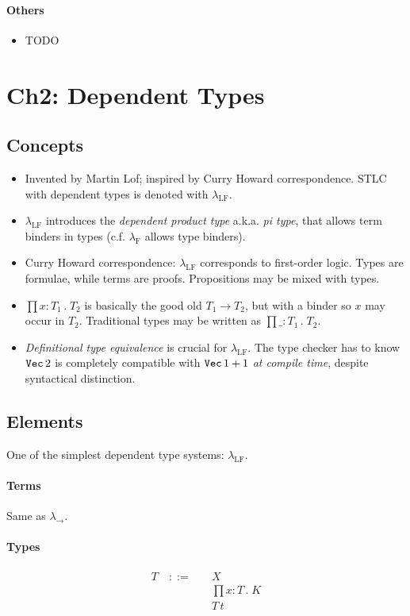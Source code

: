 \documentclass{article}
\newcommand{\TVec}{\text{\texttt{Vec}}}
\newcommand{\lambdaLF}{\lambda_{\text{LF}}}
\newcommand{\lambdaF}{\lambda_{\text{F}}}
\newcommand{\lambdato}{\lambda_{\to}}
\newcommand{\DT}{\, .\;}
\begin{document}
\paragraph{Others}
  \begin{itemize}
    \item TODO
  \end{itemize}

\section{Ch2: Dependent Types}
\subsection{Concepts}
  \begin{itemize}
    \item Invented by Martin Lof; inspired by Curry Howard correspondence. STLC with dependent types is denoted with $\lambdaLF$.
    \item $\lambdaLF$ introduces the \emph{dependent product type} a.k.a. \emph{pi type}, that allows term binders in types (c.f. $\lambdaF$ allows type binders).
    \item Curry Howard correspondence: $\lambdaLF$ corresponds to first-order logic.
        Types are formulae, while terms are proofs. Propositions may be mixed with types.
    \item $\prod x:T_1 \DT T_2$ is basically the good old $T_1 \to T_2$, but with a binder so $x$ may occur in $T_2$. Traditional types may be written as $\prod \_:T_1\DT T_2$.
    \item \emph{Definitional type equivalence} is crucial for $\lambdaLF$. The type checker has to know $\TVec\, 2$ is completely compatible with $\TVec\, 1+1$ \emph{at compile time}, despite syntactical distinction.
  \end{itemize}

\subsection{Elements}
  One of the simplest dependent type systems: $\lambdaLF$.

\paragraph{Terms}
  Same as $\lambdato$.

\paragraph{Types}
  \begin{align*}
    T \quad::= \quad & X \tag{type / family variable} \\
      & \prod x:T \DT K \tag{pi type} \\
      & T\, t \tag{pi type application} \\
  \end{align*}
\end{document}
